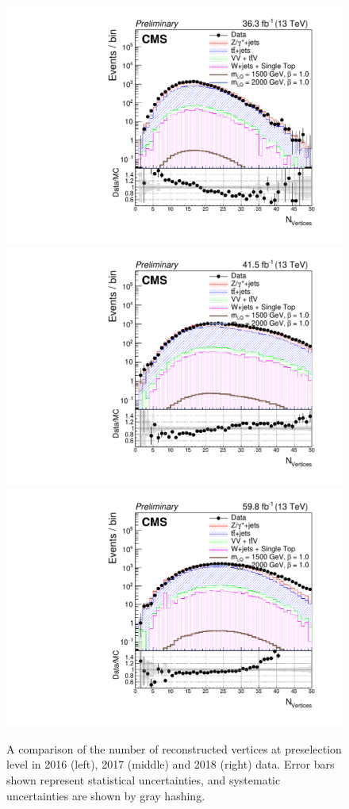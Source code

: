 \begin{figure}[H]
       \centering
       {\includegraphics[width=.32\textwidth]{Images/Analysis/Results_2016_Unblinded/Plots/Preselection/BasicLQ_uujj_GoodVertexCount_standard.pdf}}
       {\includegraphics[width=.32\textwidth]{Images/Analysis/Results_2017_Unblinded/Plots/Preselection/BasicLQ_uujj_GoodVertexCount_standard.pdf}}
       {\includegraphics[width=.32\textwidth]{Images/Analysis/Results_2018_Unblinded/Plots/Preselection/BasicLQ_uujj_GoodVertexCount_standard.pdf}}
       \caption{A comparison of the number of reconstructed vertices at preselection level in 2016 (left), 2017 (middle) and 2018 (right) data. Error bars shown represent statistical uncertainties, and systematic uncertainties are shown by gray hashing.}
       \label{figapp:vertex}
\end{figure}
